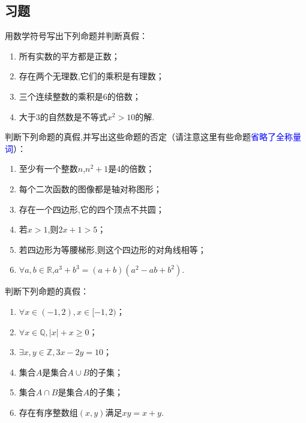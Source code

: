 \documentclass[lang=cn,math=cm,chinesefont=nofont,11pt,scheme=chinese,twocol]{elegantbook}
\begin{document}
\subsection{习题}

\begin{exercise}
  用数学符号写出下列命题并判断真假：
\end{exercise}

\begin{enumerate}
  \item 所有实数的平方都是正数；
  \item 存在两个无理数,它们的乘积是有理数；
  \item 三个连续整数的乘积是6的倍数；
  \item 大于3的自然数是不等式$x^2>10$的解.
\end{enumerate}

\begin{exercise}
  判断下列命题的真假,并写出这些命题的否定（请注意这里有些命题\textcolor{blue}{省略了全称量词}）：
\end{exercise}

\begin{enumerate}
  \item 至少有一个整数$n$,$n^2+1$是4的倍数；
  \item 每个二次函数的图像都是轴对称图形；
  \item 存在一个四边形,它的四个顶点不共圆；
  \item 若$x>1$,则$2x+1>5$；
  \item 若四边形为等腰梯形,则这个四边形的对角线相等；
   \item $\forall a,b{\in}\mathbb{R}$,$a^3+b^3=(a+b)(a^2-ab+b^2)$.
\end{enumerate}

\begin{exercise}
  判断下列命题的真假：
\end{exercise}

\begin{enumerate}
  \item $\forall x\in(-1, 2), x\in[-1, 2)$；
  \item $\forall x\in\mathbb{Q}, |x|+x\geqslant0$；
  \item $\exists x,y\in\mathbb{Z},3x-2y=10$；
  \item 集合$A$是集合$A\cup B$的子集；
  \item 集合$A\cap B$是集合$A$的子集；
  \item 存在有序整数组$(x,y)$满足$xy=x+y$.
\end{enumerate}
\end{document}
